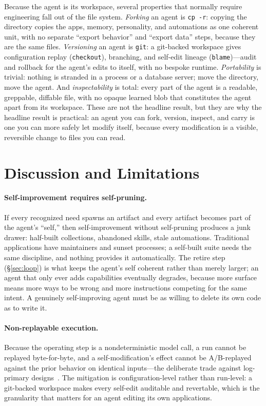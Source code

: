 \documentclass[11pt]{article}
\newcommand{\code}[1]{\texttt{\small #1}}
\begin{document}
Because the agent is its workspace, several properties that normally require
engineering fall out of the file system. \emph{Forking} an agent is \code{cp -r}:
copying the directory copies the apps, memory, personality, and automations as one
coherent unit, with no separate ``export behavior'' and ``export data'' steps,
because they are the same files. \emph{Versioning} an agent is \code{git}: a
git-backed workspace gives configuration replay (\code{checkout}), branching, and
self-edit lineage (\code{blame})---audit and rollback for the agent's edits to
itself, with no bespoke runtime. \emph{Portability} is trivial: nothing is stranded
in a process or a database server; move the directory, move the agent. And
\emph{inspectability} is total: every part of the agent is a readable, greppable,
diffable file, with no opaque learned blob that constitutes the agent apart from its
workspace. These are not the headline result, but they are why the headline result
is practical: an agent you can fork, version, inspect, and carry is one you can more
safely let modify itself, because every modification is a visible, reversible change
to files you can read.

\section{Discussion and Limitations}
\label{sec:limitations}

\paragraph{Self-improvement requires self-pruning.}
If every recognized need spawns an artifact and every artifact becomes part of the
agent's ``self,'' then self-improvement without self-pruning produces a junk drawer:
half-built collections, abandoned skills, stale automations. Traditional
applications have maintainers and sunset processes; a self-built suite needs the
same discipline, and nothing provides it automatically. The retire step
(\S\ref{sec:loop}) is what keeps the agent's self coherent rather than merely
larger; an agent that only ever adds capabilities eventually degrades, because more
surface means more ways to be wrong and more instructions competing for the same
intent. A genuinely self-improving agent must be as willing to delete its own code
as to write it.

\paragraph{Non-replayable execution.}
Because the operating step is a nondeterministic model call, a run cannot be replayed
byte-for-byte, and a self-modification's effect cannot be A/B-replayed against the
prior behavior on identical inputs---the deliberate trade against log-primary
designs~\citep{ynakajima2026log}. The mitigation is configuration-level rather than
run-level: a git-backed workspace makes every self-edit auditable and revertable,
which is the granularity that matters for an agent editing its own applications.
\end{document}
